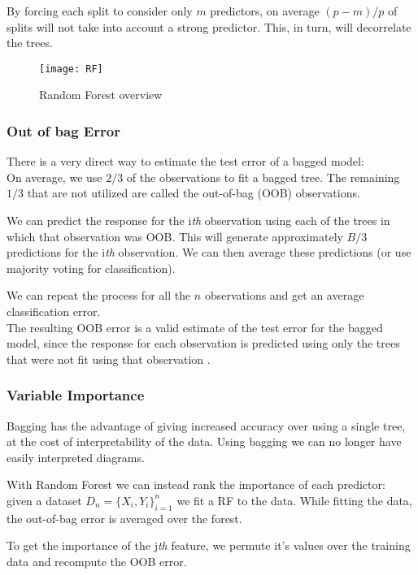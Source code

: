 By forcing each split to consider only $m$ predictors, on average $(p - m)/p$ of splits will not take into account a strong predictor. This, in turn, will decorrelate the trees.

\begin{figure}[H]
	\centering
	\texttt{[image: RF]}
	\caption{Random Forest overview}
	\label{fig:RF}
\end{figure}

\subsubsection{Out of bag Error}
There is a very direct way to estimate the test error of a bagged model: \\
On average, we use $2/3$ of the observations to fit a bagged tree. The remaining $1/3$ that are not utilized are called the out-of-bag (OOB) observations. 

We can predict the response for the i\textit{th} observation using each of the trees in which that observation was OOB. This will generate approximately $B/3$ predictions for the i\textit{th} observation.
We can then average these predictions (or use majority voting for classification). 

We can repeat the process for all the $n$ observations and get an average classification error. \\
The resulting OOB error is a valid estimate of the test error for the bagged model, since the response for each observation is predicted using only the trees that were not fit using that observation \cite{ISLR}. 

\subsubsection{Variable Importance}
Bagging has the advantage of giving increased accuracy over using a single tree, at the cost of interpretability of the data. Using bagging we can no longer have easily interpreted diagrams.

With Random Forest we can instead rank the importance of each predictor: \\
given a dataset $D_n = \{X_i, Y_i\}_{i=1}^n$ we fit a RF to the data. While fitting the data, the out-of-bag error is averaged over the forest. 

To get the importance of the j\textit{th} feature, we permute it's values over the training data and recompute the OOB error.

